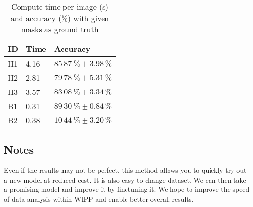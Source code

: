 \begin{table}[H]
\centering
\caption{\label{tab:baseMask}%
  Compute time per image (s) and accuracy (\%) with given masks as ground truth
}
\begin{tabular}{lll}
  \toprule
  ID & Time & Accuracy \\
  \midrule
  H1 & 4.16 & $\SI{85.87}{\percent} \pm \SI{3.98}{\percent}$ \\
  H2 & 2.81 & $\SI{79.78}{\percent} \pm \SI{5.31}{\percent}$ \\
  H3 & 3.57 & $\SI{83.08}{\percent} \pm \SI{3.34}{\percent}$ \\
  B1 & 0.31 & $\SI{89.30}{\percent} \pm \SI{0.84}{\percent}$ \\
  B2 & 0.38 & $\SI{10.44}{\percent} \pm \SI{3.20}{\percent}$ \\
  \bottomrule
\end{tabular}
\end{table}

\subsection{Notes}

Even if the results may not be perfect, this method allows you to quickly try
out a new model at reduced cost. It is also easy to change dataset. We can then
take a promising model and improve it by finetuning it. We hope to improve the
speed of data analysis within WIPP and enable better overall results.
